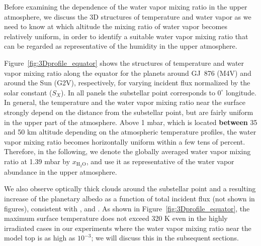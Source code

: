 \documentclass[11pt,numberedappendix,twocolappendix,]{emulateapj}
\def\water{H$_2$O}
\def\xwater{$x_\text{\water}$}
\def\preslevel{1.39 mbar}
\def\wv{water vapor}
\def\revise#1{{\bf #1}}
\begin{document}
Before examining the dependence of the \wv{} mixing ratio in the upper atmosphere, we discuss the 3D structures of temperature and water vapor as we need to know at which altitude the mixing ratio of \wv{} becomes relatively uniform, in order to identify a suitable \wv{} mixing ratio that can be regarded as representative of the humidity in the upper atmosphere. 

Figure~\ref{fig:3Dprofile_equator} shows the structures of temperature and  \wv{} mixing ratio along the equator for the planets around GJ~876 (M4V) and around the Sun (G2V), respectively, for varying incident flux normalized by the solar constant ($S_X$). 
In all panels the substellar point corresponds to $0^{\circ }$ longitude. 
In general, the temperature and the \wv{} mixing ratio near the surface strongly depend on the distance from the substellar point, but are fairly uniform in the upper part of the atmosphere. 
Above 1 mbar, which is located \revise{between} 35 and 50 km altitude depending on the atmospheric temperature profiles, the \wv{} mixing ratio becomes horizontally uniform within a few tens of percent. 
Therefore, in the following, we denote the globally averaged \wv{} mixing ratio at \preslevel{} by \xwater{}, and use it as representative of the \wv{} abundance in the upper atmosphere. 

We also observe optically thick clouds around the substellar point and a resulting increase of the planetary albedo as a function of total incident flux (not shown in figures), consistent with \citet{Yang2013,Yang2014}, \citet{Kopparapu2016} and \citet{Way2016}. 
As shown in Figure~\ref{fig:3Dprofile_equator}, the maximum surface temperature does not exceed 320 K even in the highly irradiated cases in our experiments where the \wv{} mixing ratio near the model top is as high as $10^{-3}$; we will discuss this in the subsequent sections. 
\end{document}
